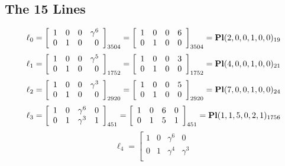 \documentclass{article}
\begin{document}
{\subsection*{The 15 Lines}
$$
\ell_{0} = 
\left[
\begin{array}{*{4}{r}}
1 & 0 & 0 & \gamma^{6}\\
0 & 1 & 0 & 0\\
\end{array}
\right]
_{3504}
=
\left[
\begin{array}{*{4}c}
1  & 0  & 0  & 6\\
0  & 1  & 0  & 0\\
\end{array}
\right]_{3504}
={\rm\bf Pl}(2,0,0,1,0,0 )_{19}$$
$$
\ell_{1} = 
\left[
\begin{array}{*{4}{r}}
1 & 0 & 0 & \gamma^{5}\\
0 & 1 & 0 & 0\\
\end{array}
\right]
_{1752}
=
\left[
\begin{array}{*{4}c}
1  & 0  & 0  & 3\\
0  & 1  & 0  & 0\\
\end{array}
\right]_{1752}
={\rm\bf Pl}(4,0,0,1,0,0 )_{21}$$
$$
\ell_{2} = 
\left[
\begin{array}{*{4}{r}}
1 & 0 & 0 & \gamma^{3}\\
0 & 1 & 0 & 0\\
\end{array}
\right]
_{2920}
=
\left[
\begin{array}{*{4}c}
1  & 0  & 0  & 5\\
0  & 1  & 0  & 0\\
\end{array}
\right]_{2920}
={\rm\bf Pl}(7,0,0,1,0,0 )_{24}$$
$$
\ell_{3} = 
\left[
\begin{array}{*{4}{r}}
1 & 0 & \gamma^{6} & 0\\
0 & 1 & \gamma^{3} & 1\\
\end{array}
\right]
_{451}
=
\left[
\begin{array}{*{4}c}
1  & 0  & 6  & 0\\
0  & 1  & 5  & 1\\
\end{array}
\right]_{451}
={\rm\bf Pl}(1,1,5,0,2,1 )_{1756}$$
$$
\ell_{4} = 
\left[
\begin{array}{*{4}{r}}
1 & 0 & \gamma^{6} & 0\\
0 & 1 & \gamma^{4} & \gamma^{3}\\

\end{array}$$}
\end{document}
